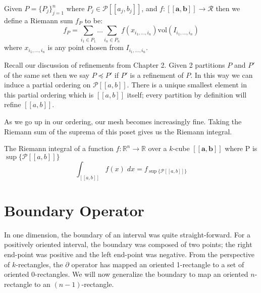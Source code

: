 \begin{definition}
	Given $P=\{ P_j \}_{j=1}^n$ where $P_j \in \mathcal{P}[\![a_j, b_j]\!]$,
	and $f:[\![\boldsymbol{a}, \boldsymbol{b}]\!] \to \mathcal{R}$ then we define a Riemann sum $f_P$ to be:
	\begin{equation}
		f_P = \sum_{i_1 \in P_1} \ldots \sum_{i_n \in P_n} f(x_{i_1, \ldots, i_n}) \text{vol}(I_{i_1, \ldots, i_n})
	\end{equation}
	where $x_{i_1, \ldots, i_n}$ is any point chosen from $I_{i_1, \ldots, i_n}$.
\end{definition}


Recall our discussion of refinements from Chapter 2.
Given 2 partitions $P$ and $P'$ of the same set then we say $P \preceq P'$ if $P'$ is a refinement of $P$.
In this way we can induce a partial ordering on $\mathcal{P}[\![a,b]\!]$.
There is a unique smallest element in this partial ordering which is $[\![a,b]\!]$ itself; 
every partition by definition will refine $[\![a,b]\!]$.


As we go up in our ordering, our mesh becomes increasingly fine.
Taking the Riemann sum of the suprema of this poset gives us the Riemann integral.

\begin{definition}
The Riemann integral of a function $f:\mathbb{R}^n \to \mathbb{R}$ over a $k$-cube $[\![\boldsymbol{a}, \boldsymbol{b}]\!]$
where P is $\sup \{ \mathcal{P} [\![a,b]\!] \}$
	\begin{equation}
		\int_{[\![a,b]\!]} f(x) \; dx = f_{\sup \{ \mathcal{P} [\![a,b]\!] \}}
	\end{equation} 
\end{definition}


%
%

\section{Boundary Operator}

In one dimension, the boundary of an interval was quite straight-forward.
For a positively oriented interval, the boundary was composed of two points; 
the right end-point was positive and the left end-point was negative.
From the perspective of $k$-rectangles, 
the $\partial$ operator has mapped an oriented 1-rectangle to a set of oriented 0-rectangles.
We will now generalize the boundary to map an oriented $n$-rectangle to an $(n-1)$-rectangle.

